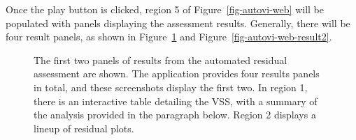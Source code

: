 \documentclass[
doublespace,
  times]{anzsauth}
\begin{document}
Once the play button is clicked, region 5 of Figure~\ref{fig-autovi-web}
will be populated with panels displaying the assessment results.
Generally, there will be four result panels, as shown in
Figure~\ref{fig-autovi-web-result} and
Figure~\ref{fig-autovi-web-result2}.

\begin{figure}


\caption{\label{fig-autovi-web-result}The first two panels of results
from the automated residual assessment are shown. The application
provides four results panels in total, and these screenshots display the
first two. In region 1, there is an interactive table detailing the VSS,
with a summary of the analysis provided in the paragraph below. Region 2
displays a lineup of residual plots.}

\end{figure}%
\end{document}
